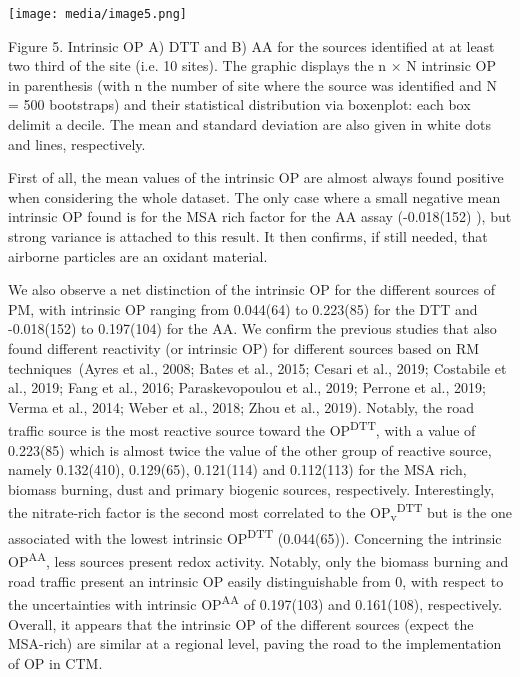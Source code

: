 \documentclass[
]{article}
\begin{document}
\texttt{[image: media/image5.png]}

Figure 5. Intrinsic OP A) DTT and B) AA for the sources identified at at
least two third of the site (i.e. 10 sites). The graphic displays the n
× N intrinsic OP in parenthesis (with n the number of site where the
source was identified and N = 500 bootstraps) and their statistical
distribution via boxenplot: each box delimit a decile. The mean and
standard deviation are also given in white dots and lines, respectively.

First of all, the mean values of the intrinsic OP are almost always
found positive when considering the whole dataset. The only case where a
small negative mean intrinsic OP found is for the MSA rich factor for
the AA assay (-0.018(152) ), but strong variance is attached to this
result. It then confirms, if still needed, that airborne particles are
an oxidant material.

We also observe a net distinction of the intrinsic OP for the different
sources of PM, with intrinsic OP ranging from 0.044(64) to 0.223(85) for
the DTT and -0.018(152) to 0.197(104) for the AA. We confirm the
previous studies that also found different reactivity (or intrinsic OP)
for different sources based on RM techniques~(Ayres et al., 2008; Bates
et al., 2015; Cesari et al., 2019; Costabile et al., 2019; Fang et al.,
2016; Paraskevopoulou et al., 2019; Perrone et al., 2019; Verma et al.,
2014; Weber et al., 2018; Zhou et al., 2019). Notably, the road traffic
source is the most reactive source toward the OP\textsuperscript{DTT},
with a value of 0.223(85) which is almost twice the value of the other
group of reactive source, namely 0.132(410), 0.129(65), 0.121(114) and
0.112(113) for the MSA rich, biomass burning, dust and primary biogenic
sources, respectively. Interestingly, the nitrate-rich factor is the
second most correlated to the OP\textsubscript{v}\textsuperscript{DTT}
but is the one associated with the lowest intrinsic
OP\textsuperscript{DTT} (0.044(65)). Concerning the intrinsic
OP\textsuperscript{AA}, less sources present redox activity. Notably,
only the biomass burning and road traffic present an intrinsic OP easily
distinguishable from 0, with respect to the uncertainties with intrinsic
OP\textsuperscript{AA} of 0.197(103) and 0.161(108), respectively.
Overall, it appears that the intrinsic OP of the different sources
(expect the MSA-rich) are similar at a regional level, paving the road
to the implementation of OP in CTM.
\end{document}
